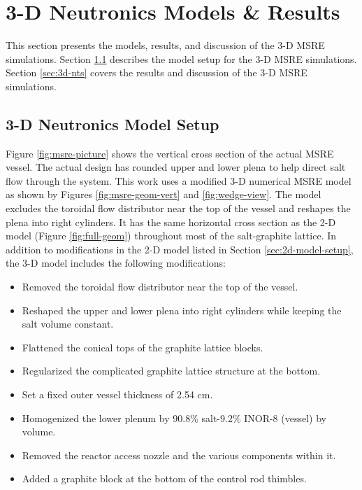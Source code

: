 \section{3-D Neutronics Models \& Results} \label{sec:3d-results}

This section presents the models, results, and discussion of the 3-D \gls{MSRE} simulations.
Section \ref{sec:3d-model-setup} describes the model setup for the 3-D \gls{MSRE} simulations.
Section \ref{sec:3d-nts} covers the results and discussion of the 3-D \gls{MSRE} simulations.

\subsection{3-D Neutronics Model Setup} \label{sec:3d-model-setup}

Figure \ref{fig:msre-picture} shows the vertical cross section of the actual \gls{MSRE} vessel.
The actual design has rounded upper and lower plena to help direct salt flow through the system.
This work uses a modified 3-D numerical \gls{MSRE} model as shown by Figures
\ref{fig:msre-geom-vert} and \ref{fig:wedge-view}. The model excludes the toroidal flow distributor
near the top
of the vessel and reshapes the plena into right cylinders. It has the same horizontal cross section
as the 2-D model (Figure \ref{fig:full-geom}) throughout most of the salt-graphite lattice. In
addition to modifications in the 2-D model listed in Section \ref{sec:2d-model-setup}, the
3-D model includes the following modifications:

\begin{itemize}
  \item Removed the toroidal flow distributor near the top of the vessel.
  \item Reshaped the upper and lower plena into right cylinders while keeping the salt volume
    constant.
  \item Flattened the conical tops of the graphite lattice blocks.
  \item Regularized the complicated graphite lattice structure at the bottom.
  \item Set a fixed outer vessel thickness of 2.54 cm.
  \item Homogenized the lower plenum by 90.8\% salt-9.2\% INOR-8 (vessel) by volume.
  \item Removed the reactor access nozzle and the various components within it.
  \item Added a graphite block at the bottom of the control rod thimbles.
\end{itemize}

